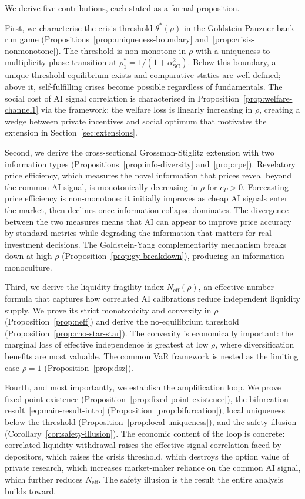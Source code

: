 We derive five contributions, each stated as a formal proposition.

First, we characterise the crisis threshold $\theta^*(\rho)$ in the Goldstein-Pauzner bank-run game (Propositions~\ref{prop:uniqueness-boundary} and~\ref{prop:crisis-nonmonotone}). The threshold is non-monotone in $\rho$ with a uniqueness-to-multiplicity phase transition at $\rho_1^* = 1/(1+\alpha_{\text{SC}}^2)$. Below this boundary, a unique threshold equilibrium exists and comparative statics are well-defined; above it, self-fulfilling crises become possible regardless of fundamentals. The social cost of AI signal correlation is characterised in Proposition~\ref{prop:welfare-channel1} via the \citet{angeletos2007} framework: the welfare loss is linearly increasing in $\rho$, creating a wedge between private incentives and social optimum that motivates the extension in Section~\ref{sec:extensions}.

Second, we derive the cross-sectional Grossman-Stiglitz extension with two information types (Propositions~\ref{prop:info-diversity} and~\ref{prop:rpe}). Revelatory price efficiency, which measures the novel information that prices reveal beyond the common AI signal, is monotonically decreasing in $\rho$ for $c_P > 0$. Forecasting price efficiency is non-monotone: it initially improves as cheap AI signals enter the market, then declines once information collapse dominates. The divergence between the two measures means that AI can appear to improve price accuracy by standard metrics while degrading the information that matters for real investment decisions. The Goldstein-Yang complementarity mechanism breaks down at high $\rho$ (Proposition~\ref{prop:gy-breakdown}), producing an information monoculture.

Third, we derive the liquidity fragility index $N_{\text{eff}}(\rho)$, an effective-number formula that captures how correlated AI calibrations reduce independent liquidity supply. We prove its strict monotonicity and convexity in $\rho$ (Proposition~\ref{prop:neff}) and derive the no-equilibrium threshold (Proposition~\ref{prop:rho-star-star}). The convexity is economically important: the marginal loss of effective independence is greatest at low $\rho$, where diversification benefits are most valuable. The \citet{danielsson2012} common VaR framework is nested as the limiting case $\rho = 1$ (Proposition~\ref{prop:dsz}).

Fourth, and most importantly, we establish the amplification loop. We prove fixed-point existence (Proposition~\ref{prop:fixed-point-existence}), the bifurcation result~\eqref{eq:main-result-intro} (Proposition~\ref{prop:bifurcation}), local uniqueness below the threshold (Proposition~\ref{prop:local-uniqueness}), and the safety illusion (Corollary~\ref{cor:safety-illusion}). The economic content of the loop is concrete: correlated liquidity withdrawal raises the effective signal correlation faced by depositors, which raises the crisis threshold, which destroys the option value of private research, which increases market-maker reliance on the common AI signal, which further reduces $N_{\text{eff}}$. The safety illusion is the result the entire analysis builds toward.

